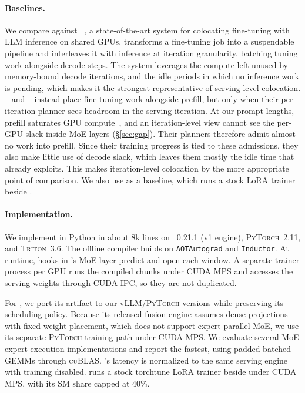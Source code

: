 \paragraph{Baselines.}
We compare against \llmstation~\cite{llmstation}, a state-of-the-art system for colocating fine-tuning with \ac{LLM} inference on shared GPUs.
\llmstation transforms a fine-tuning job into a suspendable pipeline and interleaves it with inference at iteration granularity, batching tuning work alongside decode steps.
The system leverages the compute left unused by memory-bound decode iterations, and the idle periods in which no inference work is pending,  which makes it the strongest representative of serving-level colocation.
\flexllm~\cite{flexllm} and \deltaserve~\cite{deltaserve} instead place fine-tuning work alongside prefill, but only when their per-iteration planner sees headroom in the serving iteration. At our prompt lengths, prefill saturates GPU compute~\cite{sarathi}, and an iteration-level view cannot see the per-GPU slack inside \ac{MoE} layers (\S\ref{sec:gap}). Their planners therefore admit almost no work into prefill. Since their training progress is tied to these admissions, they also make little use of decode slack, which leaves them mostly the idle time that \llmstation already exploits.
This makes iteration-level colocation by \llmstation the more appropriate point of comparison.
We also use \emph{\Uncoord} as a baseline, which runs a stock \ac{LoRA} trainer beside \vllm.

\paragraph{Implementation.}
We implement \sys in Python in about 8k lines on \vllm~0.21.1 (v1 engine), \textsc{PyTorch}~2.11, and \textsc{Triton}~3.6.
The offline compiler builds on \texttt{AOTAutograd} and \texttt{Inductor}.
At runtime, hooks in \vllm's \ac{MoE} layer predict and open each window.
A separate trainer process per GPU runs the compiled chunks under CUDA MPS and accesses the serving weights through CUDA IPC, so they are not duplicated.

For \llmstation, we port its artifact to our vLLM/\textsc{PyTorch} versions while preserving its scheduling policy.
Because its released fusion engine assumes dense projections with fixed weight placement, which does not support expert-parallel \ac{MoE}, we use its separate \textsc{PyTorch} training path under CUDA MPS.
We evaluate several \ac{MoE} expert-execution implementations and report the fastest, using padded batched \acp{GEMM} through \textsc{cuBLAS}.
\llmstation's latency is normalized to the same serving engine with training disabled.
\emph{\Uncoord} runs a stock torchtune \ac{LoRA} trainer beside \vllm under
CUDA MPS, with its \ac{SM} share capped at 40\%.

